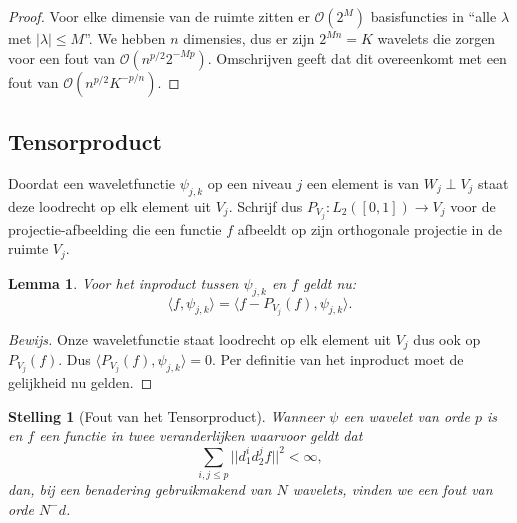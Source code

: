 \documentclass[11pt]{amsart}
\newtheorem*{lemma}{Lemma}
\newtheorem*{stelling}{Stelling}
\begin{document}
\begin{proof}
Voor elke dimensie van de ruimte zitten er $\mathcal{O}(2^M)$ basisfuncties in ``alle $\lambda$ met $|\lambda| \leq M$''. We hebben $n$ dimensies, dus er zijn $2^{Mn} = K $ wavelets die zorgen voor een fout van $\mathcal{O}(n^{p/2} 2^{-Mp})$. Omschrijven geeft dat dit overeenkomt met een fout van $\mathcal{O}(n^{p/2} K^{-p/n})$.
\end{proof}

\subsection{Tensorproduct}
Doordat een waveletfunctie $\psi_{j,k}$ op een niveau $j$ een element is van $W_j \perp V_j$ staat deze loodrecht op elk element uit $V_j$.
Schrijf dus $P_{V_j} : L_2([0,1]) \rightarrow V_j$ voor de projectie-afbeelding die een
functie $f$ afbeeldt op zijn orthogonale projectie in de ruimte $V_j$.

\begin{lemma}
Voor het inproduct tussen $\psi_{j,k}$ en $f$ geldt nu:
\[
  \langle f , \psi_{j,k} \rangle = \langle f - P_{V_j}(f) , \psi_{j,k} \rangle.
\]
\end{lemma}
\begin{proof}[Bewijs]
Onze waveletfunctie staat loodrecht op elk element uit $V_j$ dus ook op $P_{V_j}(f)$. Dus $\langle P_{V_j}(f), \psi_{j,k} \rangle = 0$. Per definitie van het inproduct moet de gelijkheid nu gelden.
\end{proof}

\begin{stelling}[Fout van het Tensorproduct]
Wanneer $\psi$ een wavelet van orde $p$ is en $f$ een functie in twee veranderlijken waarvoor geldt dat
\[
	\sum_{i,j \leq p} ||d^i_1d^j_2f||^2 < \infty,
\]
dan, bij een benadering gebruikmakend van $N$ wavelets, vinden we een fout van orde $N^-d$.
\end{stelling}
\end{document}

